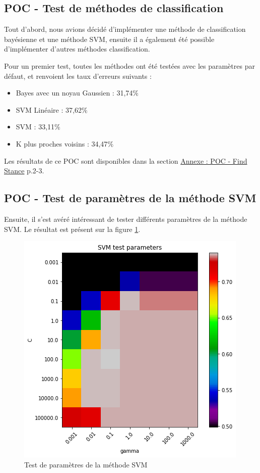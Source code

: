 \subsection{POC - Test de méthodes de classification}

Tout d'abord, nous avions décidé d'implémenter une méthode de classification bayésienne et une méthode SVM, ensuite il a également été possible d'implémenter d'autres méthodes classification.

Pour un premier test, toutes les méthodes ont été testées avec les paramètres par défaut, et renvoient les taux d'erreurs suivants :
\begin{itemize}
\item Bayes avec un noyau Gaussien : 31,74$\%$
\item SVM Linéaire : 37,62$\%$
\item SVM : 33,11$\%$
\item K plus proches voisins : 34,47$\%$
\end{itemize}

Les résultats de ce POC sont disponibles dans la section \hyperref[annexe-stance-detection]{Annexe : POC - Find Stance} p.2-3.

\subsection{POC - Test de paramètres de la méthode SVM}

Ensuite, il s'est avéré intéressant de tester différents paramètres de la méthode SVM. Le résultat est présent sur la figure \ref{svm}.

\begin{figure}[H]
	\centering
	\label{svm}
	\includegraphics{src/annexes/POC_FindStance_V2/output_24_0.png}
	\caption{Test de paramètres de la méthode SVM}
\end{figure}

